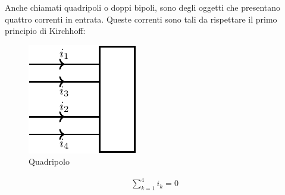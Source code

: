 \documentclass{article}
\numberwithin{equation}{subsection}
\begin{document}
Anche chiamati quadripoli o doppi bipoli, sono degli oggetti che presentano quattro correnti in entrata. Queste correnti sono tali da rispettare il primo principio di 
Kirchhoff:
\begin{figure}[ht]%
    \centering
    \includegraphics{quadripolo.pdf}
    \caption{Quadripolo}
    \label{fig:quadripolo}
\end{figure}
\begin{gather*}
    \displaystyle\sum_{k=1}^4i_k=0
\end{gather*}
\end{document}
